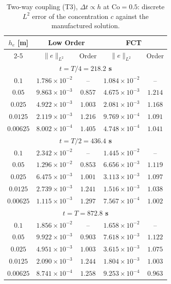 \begin{table}[t]
\centering
\begin{tabular}{c|cc|cc}
\hline
\multirow{2}{*}{$h_e$ [m]}
& \multicolumn{2}{c|}{\textbf{Low Order}}
& \multicolumn{2}{c}{\textbf{FCT}} \\
\cline{2-5}
& $\|e\|_{L^2}$ & Order
& $\|e\|_{L^2}$ & Order \\
\hline
\hline

\multicolumn{5}{c}{\textbf{$t = T/4 = 218.2$ s}} \\
\hline
$0.1$        & $1.786\times10^{-2}$ & --
           & $1.084\times10^{-2}$ & -- \\
$0.05$       & $9.863\times10^{-3}$ & $0.857$
           & $4.675\times10^{-3}$ & $1.214$ \\
$0.025$      & $4.922\times10^{-3}$ & $1.003$
           & $2.081\times10^{-3}$ & $1.168$ \\
$0.0125$     & $2.119\times10^{-3}$ & $1.216$
           & $9.769\times10^{-4}$ & $1.091$ \\
$0.00625$    & $8.002\times10^{-4}$ & $1.405$
           & $4.748\times10^{-4}$ & $1.041$ \\
\hline\hline

\multicolumn{5}{c}{\textbf{$t = T/2 = 436.4$ s}} \\
\hline
$0.1$        & $2.342\times10^{-2}$ & --
           & $1.445\times10^{-2}$ & -- \\
$0.05$       & $1.296\times10^{-2}$ & $0.853$
           & $6.656\times10^{-3}$ & $1.119$ \\
$0.025$      & $6.475\times10^{-3}$ & $1.001$
           & $3.113\times10^{-3}$ & $1.097$ \\
$0.0125$     & $2.739\times10^{-3}$ & $1.241$
           & $1.516\times10^{-3}$ & $1.038$ \\
$0.00625$    & $1.115\times10^{-3}$ & $1.297$
           & $7.567\times10^{-4}$ & $1.002$ \\
\hline\hline

\multicolumn{5}{c}{\textbf{$t = T = 872.8$ s}} \\
\hline
$0.1$        & $1.856\times10^{-2}$ & --
           & $1.658\times10^{-2}$ & -- \\
$0.05$       & $9.922\times10^{-3}$ & $0.903$
           & $7.618\times10^{-3}$ & $1.122$ \\
$0.025$      & $4.951\times10^{-3}$ & $1.003$
           & $3.615\times10^{-3}$ & $1.075$ \\
$0.0125$     & $2.090\times10^{-3}$ & $1.244$
           & $1.804\times10^{-3}$ & $1.003$ \\
$0.00625$    & $8.741\times10^{-4}$ & $1.258$
           & $9.253\times10^{-4}$ & $0.963$ \\
\hline
\end{tabular}
\caption{Two-way coupling (T3), $\Delta t\propto h$ at $\mathrm{Co}=0.5$: discrete $L^2$ error of the concentration $c$ against the manufactured solution.}
\label{tab:mms_t3_c}
\end{table}


